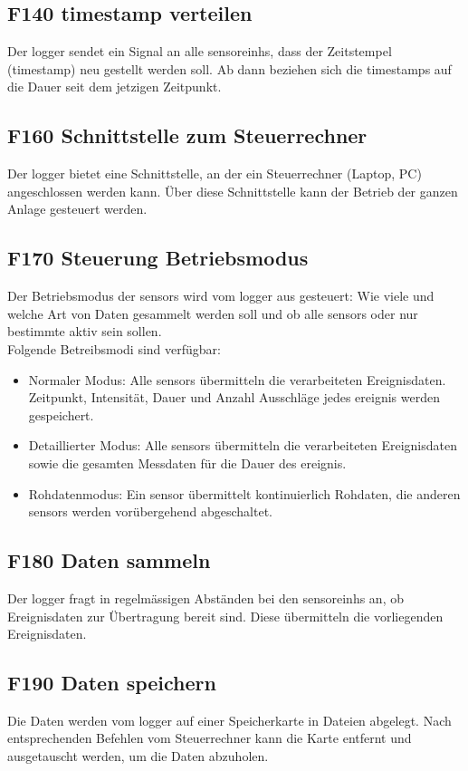 \subsection{F140 \gls{timestamp} verteilen}
Der \gls{logger} sendet ein Signal an alle \glspl{sensoreinh}, dass der Zeitstempel (\gls{timestamp}) neu gestellt werden soll. Ab dann beziehen sich die \gls{timestamp}s auf die Dauer seit dem jetzigen Zeitpunkt.


\subsection{F160 Schnittstelle zum Steuerrechner}
Der \gls{logger} bietet eine Schnittstelle, an der ein Steuerrechner (Laptop, PC) angeschlossen werden kann. Über diese Schnittstelle kann der Betrieb der ganzen Anlage gesteuert werden.


\subsection{F170 Steuerung Betriebsmodus}
Der Betriebsmodus der \glspl{sensor} wird vom \gls{logger} aus gesteuert: Wie viele und welche Art von Daten gesammelt werden soll und ob alle \glspl{sensor} oder nur bestimmte aktiv sein sollen. \\
Folgende Betreibsmodi sind verfügbar:
\begin{itemize}
\item Normaler Modus: Alle \glspl{sensor} übermitteln die verarbeiteten Ereignisdaten. Zeitpunkt, Intensität, Dauer und Anzahl Ausschläge jedes \gls{ereignis} werden gespeichert.
\item Detaillierter Modus: Alle \glspl{sensor} übermitteln die verarbeiteten Ereignisdaten sowie die gesamten Messdaten für die Dauer des \gls{ereignis}.
\item Rohdatenmodus: Ein \gls{sensor} übermittelt kontinuierlich Rohdaten, die anderen \glspl{sensor} werden vorübergehend abgeschaltet.
\end{itemize}


\subsection{F180 Daten sammeln}
Der \gls{logger} fragt in regelmässigen Abständen bei den \glspl{sensoreinh} an, ob Ereignisdaten zur Übertragung bereit sind. Diese übermitteln die vorliegenden Ereignisdaten.


\subsection{F190 Daten speichern}
Die Daten werden vom \gls{logger} auf einer Speicherkarte in Dateien abgelegt. Nach entsprechenden Befehlen vom Steuerrechner kann die Karte entfernt und ausgetauscht werden, um die Daten abzuholen.


